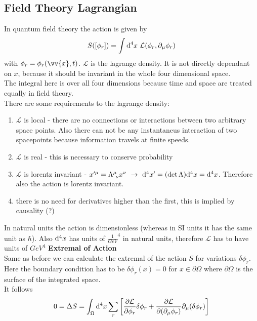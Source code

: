 \documentclass{include/thesisclass}
\newcommand{\LL}{\mathcal{L}}
\newcommand{\vx}{\vv{x}}
\newcommand{\df}{\rightarrow}
\newcommand{\dd}{{\rm d}}
\newcommand{\p}{\partial}
\begin{document}
\subsection{Field Theory Lagrangian}
In quantum field theory the action is given by
\[ S([\phi_r]) = \int \dd ^4 x~\mathcal{L}(\phi_r, \p_\mu \phi_r)\]
with $\phi_r = \phi_r(\vx, t)$. $\LL$ is the lagrange density. It is not directly dependant on $x$, because it should be invariant in the whole four dimensional space.\\
The integral here is over all four dimensions because time and space are treated equally in field theory.\\
There are some requirements to the lagrange density:
\begin{enumerate}
\item $\LL$ is local - there are no connections or interactions between two arbitrary space points. Also there can not be any instantaneus interaction of two spacepoints because information travels at finite speeds.
\item $\LL$ is real - this is necessary to conserve probability
\item $\LL$ is lorentz invariant - $x'^\mu = \Lambda^\mu_{~\nu}x^\nu ~\df~ \dd^4 x' = (\det \Lambda) \dd^4 x = \dd ^4 x$. Therefore also the action is lorentz invariant.
\item there is no need for derivatives higher than the first, this is implied by causality (?)
\end{enumerate}
In natural units the action is dimensionless (whereas in SI units it has the same unit as $\hbar$). Also $\dd^4 x$ has units of $\si{\frac{1}{GeV}^4}$ in natural units, therefore $\LL$ has to have units of $\si{GeV}^4$
\newline\newline
\textbf{Extremal of Action}\\
Same as before we can calculate the extremal of the action $S$ for variations $\delta \phi_r$. Here the boundary condition has to be $\delta \phi_r(x) = 0$ for $x \in \p \Omega$ where $\p \Omega$ is the surface of the integrated space.\\
It follows
\[ 0 = \Delta S = \int_\Omega \dd ^4 x \sum_r \left[ \frac{\p \LL}{\p \phi_r} \delta \phi_r + \frac{ \p \LL}{\p (\p_\mu \phi_r)} \p_\mu(\delta \phi_r) \right]\]
\end{document}
